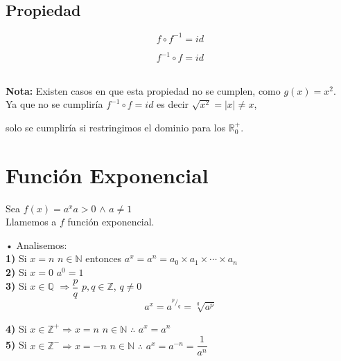 \subsection{Propiedad}
\hfill
\begin{minipage}{.45\textwidth}
\begin{center}
$$f\circ f^{-1} = id $$
\end{center}
\end{minipage}
\hfill
\begin{minipage}{.45\textwidth}
\begin{center}
$$f^{-1}\circ f = id $$
\end{center}
\end{minipage}
\hfill \\

\textbf{Nota:} Existen casos en que esta propiedad no se cumplen, como $g(x)=x^2$.\\

\qquad Ya que no se cumpliría $f^{-1}\circ f = id $ es decir $\sqrt{x^2}=|x| \neq x$,

\qquad \quad solo se cumpliría si restringimos el dominio para los $\mathbb{R} _0 ^+$.
\section{Función Exponencial}

Sea $f(x)= a^x$\qquad $a>0 $ $\wedge$ $ a\neq 1$ \\

\qquad Llamemos a $f$ función exponencial.

• Analisemos:\\

\textbf{1)} Si $x=n$ \quad $n \in \mathbb{N}$ entonces $a^x=a^n=a_0 \times a_1 \times \cdots \times a_n$\\

\textbf{2)} Si $x=0$ \quad $a^0 =1$\\

\textbf{3)} Si $x\in \mathbb{Q}$ \quad $\Rightarrow \dfrac{p}{q}$ \quad $p,q \in \mathbb{Z}$, $q \neq 0$
$$a^x=a^{^p/_q}=\sqrt[q]{a^p}$$

\textbf{4)} Si $x \in \mathbb{Z} ^+ \Rightarrow x =n$ \quad $n \in \mathbb{N}$ $\therefore$ $a^x=a^n$\\ 

\textbf{5)} Si $x \in \mathbb{Z} ^- \Rightarrow x =-n$ \quad $n \in \mathbb{N}$ $\therefore$ $a^x=a^{-n}=\dfrac{1}{a^n}$\\

